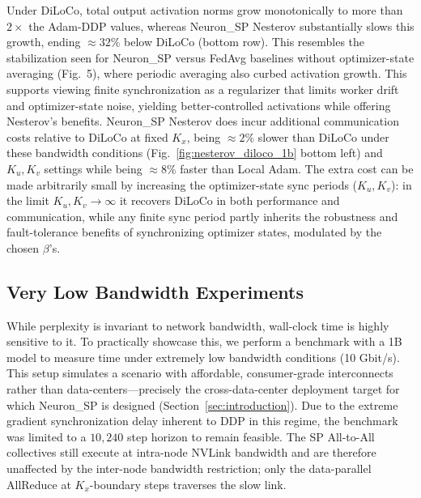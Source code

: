 \documentclass{article}
\begin{document}
Under DiLoCo, total output activation norms grow monotonically to more than $2\times$ the Adam-DDP values, whereas Neuron\_SP Nesterov substantially slows this growth, ending $\approx 32\%$ below DiLoCo (bottom row). This resembles the stabilization seen for Neuron\_SP versus FedAvg baselines without optimizer-state averaging (Fig.~5), where periodic averaging also curbed activation growth. This supports viewing finite synchronization as a regularizer that limits worker drift and optimizer-state noise, yielding better-controlled activations while offering Nesterov's benefits. Neuron\_SP Nesterov does incur additional communication costs relative to DiLoCo at fixed $K_x$, being $\approx 2\%$ slower than DiLoCo under these bandwidth conditions (Fig.~\ref{fig:nesterov_diloco_1b} bottom left) and $K_u, K_v$ settings while being $\approx 8\%$ faster than Local Adam. The extra cost can be made arbitrarily small by increasing the optimizer-state sync periods ($K_u, K_v$): in the limit $K_u, K_v \rightarrow \infty$ it recovers DiLoCo in both performance and communication, while any finite sync period partly inherits the robustness and fault-tolerance benefits of synchronizing optimizer states, modulated by the chosen $\beta$'s.

\begin{center}\end{center}

\subsection{Very Low Bandwidth Experiments}
\label{sec:b6_low_bandwidth}

While perplexity is invariant to network bandwidth, wall-clock time is highly sensitive to it. To practically showcase this, we perform a benchmark with a 1B model to measure time under extremely low bandwidth conditions (10 Gbit/s). This setup simulates a scenario with affordable, consumer-grade interconnects rather than data-centers---precisely the cross-data-center deployment target for which Neuron\_SP is designed (Section~\ref{sec:introduction}). Due to the extreme gradient synchronization delay inherent to DDP in this regime, the benchmark was limited to a $10{,}240$ step horizon to remain feasible. The SP All-to-All collectives still execute at intra-node NVLink bandwidth and are therefore unaffected by the inter-node bandwidth restriction; only the data-parallel AllReduce at $K_x$-boundary steps traverses the slow link.
\end{document}
